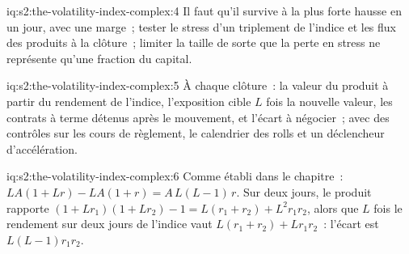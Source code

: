 \begin{solution}{iq:s2:the-volatility-index-complex:4}
Il faut qu'il survive à la plus forte hausse en un jour, avec une marge~; tester le stress d'un triplement de l'indice et les flux des produits à la clôture~; limiter la taille
de sorte que la perte en stress ne représente qu'une fraction du capital.
\end{solution}

\begin{solution}{iq:s2:the-volatility-index-complex:5}
À chaque clôture~: la valeur du produit à partir du rendement de l'indice, l'exposition cible $L$ fois la nouvelle valeur, les contrats à terme détenus après le mouvement, et
l'écart à négocier~; avec des contrôles sur les cours de règlement, le calendrier des rolls et un déclencheur d'accélération.
\end{solution}

\begin{solution}{iq:s2:the-volatility-index-complex:6}
Comme établi dans le chapitre~: $LA(1 + Lr) - LA(1 + r) = A\,L(L - 1)\,r$. Sur deux jours, le produit rapporte $(1 + Lr_1)(1 + Lr_2) - 1 = L(r_1 + r_2) +
L^2 r_1 r_2$, alors que $L$ fois le rendement sur deux jours de l'indice vaut $L(r_1 + r_2) + L r_1 r_2$~: l'écart est $L(L - 1)r_1 r_2$.
\end{solution}
